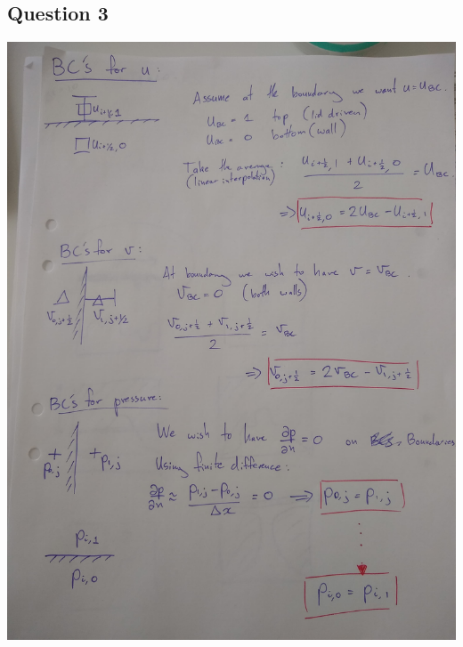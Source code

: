 \documentclass[10pt,a4paper]{article}
\begin{document}
\subsection{Question 3}
\includegraphics[width=\textwidth]{Q3A.jpg}
\newpage
\end{document}
